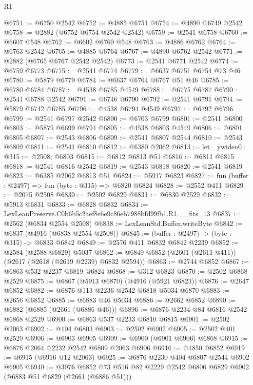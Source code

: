 \begin{lexlean}{R1}
\begin{coremodule}
@6751 := @6750 @2542
@6752 := @4885 @6751
@6754 := @4890 @6749 @2542
@6758 := @2882 (@6752 @6754 @2542 @2542)
@6759 := @2541 @6758
@6760 := @6607 @548
@6762 := @6602 @6760 @548
@6763 := @4886 @6762
@6764 := @6763 @2542
@6765 := @4885 @6764
@6767 := @4890 @6762 @2542
@6771 := @2882 (@6765 @6767 @2542 @2542)
@6773 := @2541 @6771 @2542
@6774 := @6759 @6773
@6775 := @2541 @6774
@6779 := @6637 @6751 @6754 @73 @46
@6780 := @5879 @6779
@6784 := @6637 @6764 @6767 @51 @46
@6785 := @6780 @6784
@6787 := @4538 @6785 @4549
@6788 := @6775 @6787
@6790 := @2541 @6788 @2542
@6791 := @6746 @6790
@6792 := @2541 @6791
@6794 := @5879 @6742 @6785
@6796 := @4538 @6794 @4549
@6797 := @6792 @6796
@6799 := @2541 @6797 @2542
@6800 := @6703 @6799
@6801 := @2541 @6800
@6803 := @5879 @6699 @6794
@6805 := @4538 @6803 @4549
@6806 := @6801 @6805
@6807 := @2543 @6806
@6809 := @2541 @6807 @2544
@6810 := @2543 @6809
@6811 := @2541 @6810
@6812 := @6380 @2062
@6813 := let _ywiden0 : @315 := @2508; @6803
@6815 := @6812 @6813 @51
@6816 := @6811 @6815
@6818 := @2541 @6816 @2542
@6819 := @2543 @6818
@6820 := @2541 @6819
@6823 := @6385 @2062 @6813 @51
@6824 := @5917 @6823
@6827 := fun (buffer : @2497) => fun (byte : @315) => @6820 @6824
@6828 := @2552 @411
@6829 := @2075 @2508
@6830 := @2502 @6829
@6831 := @6830 @2529
@6832 := @5913 @6831
@6833 := @6828 @6832
@6834 := LexLeanPreserve.C0b6b5c2aef8e6e9c86eb7988bfd99fb1.R1.__fits_13
@6837 := @2562 (@6834 @2554 @2508)
@6838 := LexLeanStd.Buffer.writeByte
@6842 := @6837 (@4916 (@6838 @2554 @2508))
@6845 := (buffer : @2497) -> (byte : @315) -> @6833 @6842
@6849 := @2576 @411 @6832 @6842 @2239
@6852 := @2584 (@2588 @6829) @5037
@6862 := @6849 @6852 (@2601 (@2611 @411)) (@2617 (@2618 (@2619 @2239) @6832 @2594))
@6863 := @2744 @6852
@6867 := @6863 @532 @2237 @6819 @6824
@6868 := @312 @6823
@6870 := @2502 @6868 @2529
@6875 := @6867 (@5913 @6870) (@4916 (@5921 @6823))
@6876 := @2647 @6852
@6882 := @6876 @113 @2236 @2542 @6818 @5034 @6870
@6883 := @2656 @6852
@6885 := @6883 @46 @5034
@6886 := @2662 @6852
@6890 := @6882 (@6885 (@2661 (@6886 @46)))
@6896 := @6876 @2234 @84 @6816 @2542 @6868 @2529
@6900 := @6863 @537 @2233 @6810 @6815
@6901 := @2502 @2063
@6902 := @104 @6803
@6903 := @2502 @6902
@6905 := @2502 @401 @2529
@6906 := @6903 @6905
@6909 := @6900 (@6901 @6906) @6868
@6915 := @6876 @2064 @2232 @2542 @6809 @2063 @6906
@6916 := @4850 @6852
@6919 := @6915 (@6916 @12 @2063)
@6925 := @6876 @2230 @404 @6807 @2544 @6902 @6905
@6940 := @3976
    @6852
    @73
    @516
    @82
    @2229
    @2542
    @6806
    @6829
    @6902
    (@6883 @51 @6829 (@2661 (@6886 @51)))

\end{coremodule}
\end{lexlean}
